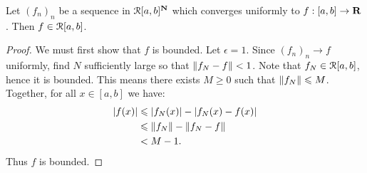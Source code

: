 \documentclass[10pt,twoside,openany]{memoir}
\begin{document}
    \begin{proposition}
        Let $(f_n)_n$ be a sequence in $\mathcal{R}[a,b]^{\mathbf{N}}$ which converges uniformly to $f:[a,b] \rightarrow \mathbf{R}$. Then $f \in \mathcal{R}[a,b]$.
    \end{proposition}
        \begin{proof}
            We must first show that $f$ is bounded. Let $\epsilon = 1$. Since $(f_n)_n \rightarrow f$ uniformly, find $N$ sufficiently large so that $\left\lVert f_N - f \right\rVert < 1$. Note that $f_N \in \mathcal{R}[a,b]$, hence it is bounded. This means there exists $M \geq 0$ such that $\left\lVert f_N \right\rVert \leqslant M$. Together, for all $x \in [a,b]$ we have:
                \begin{equation*}
                \begin{split}
                    |f(x)| 
                    &\leqslant |f_N(x)| - |f_N(x) - f(x)| \\
                    & \leqslant \left\lVert f_N \right\rVert - \left\lVert f_N - f \right\rVert \\
                    & < M - 1.
                \end{split}
                \end{equation*}
            Thus $f$ is bounded.


\end{proof}
\end{document}
